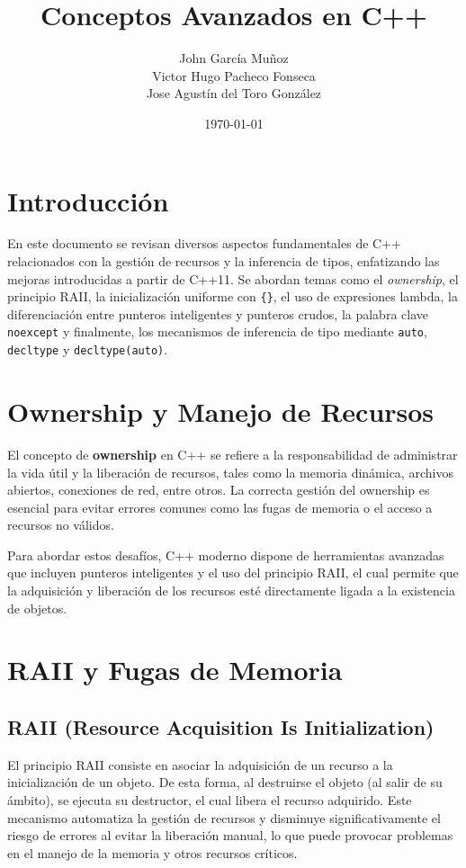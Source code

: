 \documentclass{article}
\title{Conceptos Avanzados en C++}
\author{John García Muñoz\\ Victor Hugo Pacheco Fonseca\\ Jose Agustín del Toro González}
\date{\today}
\begin{document}
\maketitle

\section{Introducción}
En este documento se revisan diversos aspectos fundamentales de C++ relacionados con la gestión de recursos y la inferencia de tipos, enfatizando las mejoras introducidas a partir de C++11. Se abordan temas como el \emph{ownership}, el principio RAII, la inicialización uniforme con \texttt{\{\}}, el uso de expresiones lambda, la diferenciación entre punteros inteligentes y punteros crudos, la palabra clave \texttt{noexcept} y finalmente, los mecanismos de inferencia de tipo mediante \texttt{auto}, \texttt{decltype} y \texttt{decltype(auto)}.

\section{Ownership y Manejo de Recursos}
El concepto de \textbf{ownership} en C++ se refiere a la responsabilidad de administrar la vida útil y la liberación de recursos, tales como la memoria dinámica, archivos abiertos, conexiones de red, entre otros. La correcta gestión del ownership es esencial para evitar errores comunes como las fugas de memoria o el acceso a recursos no válidos.

Para abordar estos desafíos, C++ moderno dispone de herramientas avanzadas que incluyen punteros inteligentes y el uso del principio RAII, el cual permite que la adquisición y liberación de los recursos esté directamente ligada a la existencia de objetos.

\section{RAII y Fugas de Memoria}
\subsection{RAII (Resource Acquisition Is Initialization)}
El principio RAII consiste en asociar la adquisición de un recurso a la inicialización de un objeto. De esta forma, al destruirse el objeto (al salir de su ámbito), se ejecuta su destructor, el cual libera el recurso adquirido. Este mecanismo automatiza la gestión de recursos y disminuye significativamente el riesgo de errores al evitar la liberación manual, lo que puede provocar problemas en el manejo de la memoria y otros recursos críticos.
\end{document}
